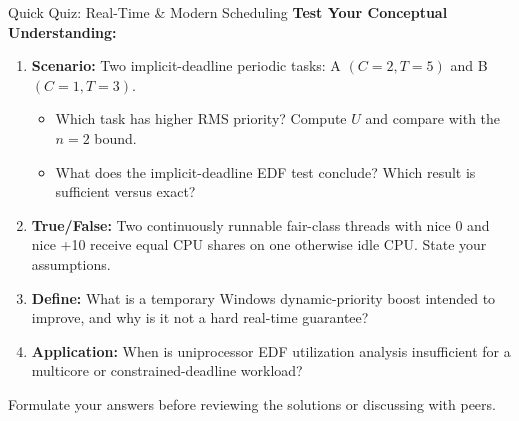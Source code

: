 \documentclass[aspectratio=169,11pt]{beamer}
\begin{document}
\begin{frame}[allowframebreaks]{Quick Quiz: Real-Time \& Modern Scheduling}
  \small
  \textbf{Test Your Conceptual Understanding:}

  \vspace{0.3cm}

  \begin{enumerate}
      \item \textbf{Scenario:} Two implicit-deadline periodic tasks: A $(C=2,T=5)$ and B $(C=1,T=3)$.
      \begin{itemize}
          \item Which task has higher RMS priority? Compute $U$ and compare with the $n=2$ bound.
          \item What does the implicit-deadline EDF test conclude? Which result is sufficient versus exact?
      \end{itemize}
      \vspace{0.2cm}
      \item \textbf{True/False:} Two continuously runnable fair-class threads with nice 0 and nice +10 receive equal CPU shares on one otherwise idle CPU. State your assumptions.
      \vspace{0.2cm}
      \item \textbf{Define:} What is a temporary Windows dynamic-priority boost intended to improve, and why is it not a hard real-time guarantee?
      \vspace{0.2cm}
      \item \textbf{Application:} When is uniprocessor EDF utilization analysis insufficient for a multicore or constrained-deadline workload?
  \end{enumerate}

  \vspace{0.5cm}
  \begin{tcolorbox}[title=\textbf{Think \& Discuss}, colback=orange!5!white, colframe=orange!75!black, fonttitle=\bfseries]
  Formulate your answers before reviewing the solutions or discussing with peers.
  \end{tcolorbox}
\end{frame}
\end{document}

